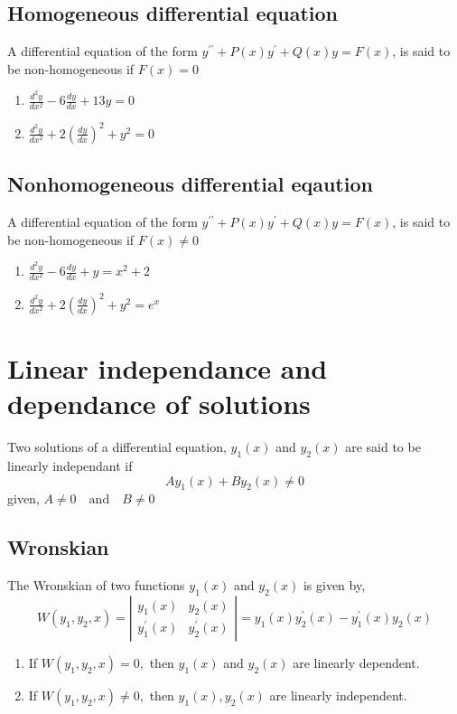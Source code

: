 \subsection{Homogeneous differential equation}
A differential equation of the form
$y^{\prime \prime}+P(x) y^{\prime}+Q(x) y=F(x)$, is said to be  non-homogeneous if $F(x)= 0$
\begin{example}
	\hspace{0.5cm}
	\begin{enumerate}
		\item 	$\frac{d^{2} y}{d x^{2}}-6 \frac{d y}{d x}+13 y=0$
		\item $\frac{d^{2} y}{d x^{2}}+2\left(\frac{d y}{d x}\right)^{2}+y^{2}=0$
	\end{enumerate}

\end{example}
\subsection{Nonhomogeneous differential eqaution} A differential equation of the form
$y^{\prime \prime}+P(x) y^{\prime}+Q(x) y=F(x)$, is said to be  non-homogeneous if $F(x)\neq 0$
\begin{example}
\hspace{0.5cm}
\begin{enumerate}
	\item 	$\frac{d^{2} y}{d x^{2}}-6 \frac{d y}{d x}+ y=x^{2}+2$
	\item $\frac{d^{2} y}{d x^{2}}+2\left(\frac{d y}{d x}\right)^{2}+y^{2}=e^{x}$
\end{enumerate}
\end{example}
\section{Linear independance and dependance of solutions}
Two solutions of a differential equation, $ y_{1}(x)$ and $ y_{2}(x)$ are said to be linearly independant if \\$$Ay_{1}(x)+By_{2}(x)\neq 0 $$ given, $ A\neq0 \quad\text{and}\quad B\neq0$
\subsection{Wronskian}
The Wronskian of two functions $y_{1}(x)$ and $y_{2}(x)$ is given by,
$$
W\left(y_{1}, y_{2}, x\right)=\left|\begin{array}{ll}
y_{1}(x) & y_{2}(x) \\
y_{1}^{\prime}(x) & y_{2}^{\prime}(x)
\end{array}\right|=y_{1}(x) y_{2}^{\prime}(x)-y_{1}^{\prime}(x) y_{2}(x)
$$
\begin{enumerate}
	\item If $W\left(y_{1}, y_{2}, x\right)=0,$ then $y_{1}(x)$ and $y_{2}(x)$ are linearly dependent.
	\item If $W\left(y_{1}, y_{2}, x\right) \neq 0,$ then $y_{1}(x), y_{2}(x)$ are linearly independent.
\end{enumerate}

